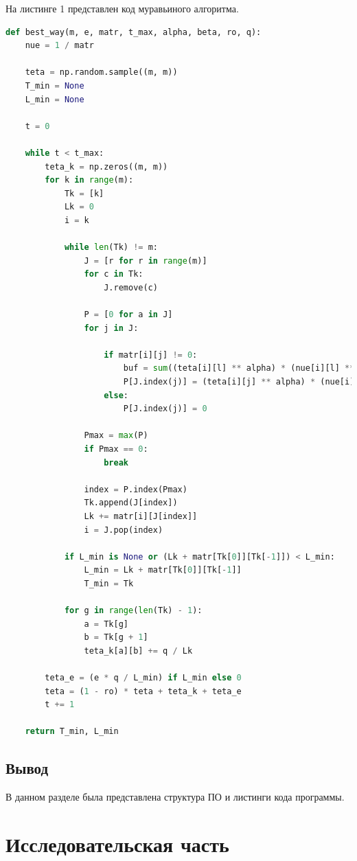 \documentclass[a4paper, 12pt]{article}
\begin{document}
	\lstset{style=mystyle}

	\hspace*{-7mm} На листинге 1 представлен код муравьиного алгоритма.
	\begin{lstlisting}[language=Python, caption = Муравьиный алгоритм]
def best_way(m, e, matr, t_max, alpha, beta, ro, q):
	nue = 1 / matr  
	
	teta = np.random.sample((m, m))  
	T_min = None  
	L_min = None   
	
	t = 0  
	
	while t < t_max:
		teta_k = np.zeros((m, m)) 
		for k in range(m):  
			Tk = [k] 
			Lk = 0 
			i = k   
	
			while len(Tk) != m:
				J = [r for r in range(m)]  
				for c in Tk: 
					J.remove(c)
	
				P = [0 for a in J]  
				for j in J:
	
					if matr[i][j] != 0: 
						buf = sum((teta[i][l] ** alpha) * (nue[i][l] ** beta) for l in J)
						P[J.index(j)] = (teta[i][j] ** alpha) * (nue[i][j] ** beta) / buf
					else:
						P[J.index(j)] = 0
	
				Pmax = max(P)
				if Pmax == 0:
					break
	
				index = P.index(Pmax) 
				Tk.append(J[index])   
				Lk += matr[i][J[index]]  
				i = J.pop(index)  
	
			if L_min is None or (Lk + matr[Tk[0]][Tk[-1]]) < L_min: 
				L_min = Lk + matr[Tk[0]][Tk[-1]]                   
				T_min = Tk
	
			for g in range(len(Tk) - 1):  
				a = Tk[g]
				b = Tk[g + 1]
				teta_k[a][b] += q / Lk
	
		teta_e = (e * q / L_min) if L_min else 0   
		teta = (1 - ro) * teta + teta_k + teta_e     
		t += 1
	
	return T_min, L_min
	\end{lstlisting}
	
	\subsection{Вывод}
	\hspace*{5mm} В данном разделе была представлена структура ПО и листинги кода программы. 
	


\newpage
\section{Исследовательская часть }
\end{document}
